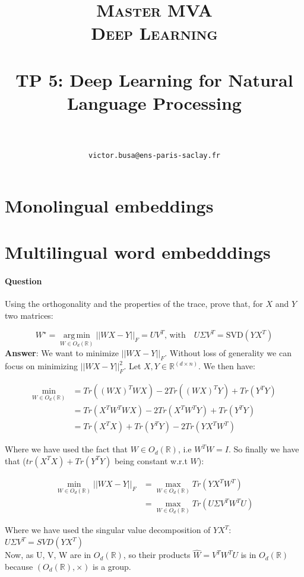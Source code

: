 \documentclass[11pt]{article}
\title{	
\normalfont \normalsize 
\textsc{Master MVA \\
Deep Learning} \\ [12pt]
\horrule{0.5pt} \\[0.2cm] %
\textbf{TP 5}: Deep Learning for Natural Language Processing \\
\horrule{2pt} \\[0.3cm] %
}
\author{\texttt{victor.busa@ens-paris-saclay.fr}}
\date{}
\DeclareMathOperator*{\argmin}{arg\,min}
\numberwithin{figure}{section} %
\begin{document}
\maketitle

\section{Monolingual embeddings}
\section{Multilingual word embedddings}
\paragraph{Question} Using the orthogonality and the properties of the trace, prove that, for $X$ and $Y$ two matrices:

\begin{equation}
W^{\star} = \argmin\limits_{W \in O_d(\mathbb{R})} ||WX - Y||_F = UV^T \text{, with} \quad U \Sigma V^T = \text{SVD}(YX^T)
\end{equation}
\textbf{Answer}: We want to minimize $||WX - Y||_F$. Without loss of generality we can focus on minimizing $||WX - Y||_F^2$. Let $X,Y \in \mathbb{R}^(d \times n)$. We then have:

\begin{align*}
\min\limits_{W \in O_d(\mathbb{R})} &= Tr\left((WX)^T WX \right) - 2 Tr\left((WX)^T Y\right) + Tr(Y^TY) \\
&= Tr(X^TW^TWX) - 2 Tr(X^TW^TY) + Tr(Y^TY) \\
&= Tr(X^TX) + Tr(Y^TY) - 2Tr(YX^TW^T)
\end{align*}

Where we have used the fact that $W \in O_d(\mathbb{R})$, i.e $W^TW = I$. So finally we have that ($tr(X^TX) + Tr(Y^TY)$ being constant w.r.t $W$):

\begin{align*}
\min\limits_{W \in O_d(\mathbb{R})} ||WX - Y||_F &= \max\limits_{W \in O_d(\mathbb{R})} Tr(YX^TW^T) \\
&= \max\limits_{W \in O_d(\mathbb{R})} Tr(U \Sigma V^T W^T U)
\end{align*}

Where we have used the singular value decomposition of $YX^T$: $U \Sigma V^T = SVD(YX^T)$ \\

Now, as U, V, W are in $O_d(\mathbb{R})$, so their products $\widehat{W} = V^T W^T U$ is in $O_d(\mathbb{R})$ because $(O_d(\mathbb{R}), \times)$ is a group. \\
\end{document}
